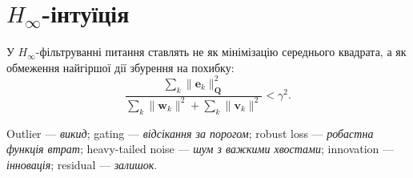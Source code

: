 \section{$H_\infty$-інтуїція}

У $H_\infty$-фільтруванні питання ставлять не як мінімізацію середнього квадрата, а як обмеження найгіршої дії збурення на похибку:
\begin{equation}
 \frac{\sum_k \|\mathbf{e}_k\|^2_{\mathbf{Q}}}{\sum_k \|\mathbf{w}_k\|^2+\sum_k \|\mathbf{v}_k\|^2} < \gamma^2.
\end{equation}

Outlier --- \emph{викид}; gating --- \emph{відсікання за порогом}; robust loss --- \emph{робастна функція втрат}; heavy-tailed noise --- \emph{шум з важкими хвостами}; innovation --- \emph{інновація}; residual --- \emph{залишок}.

